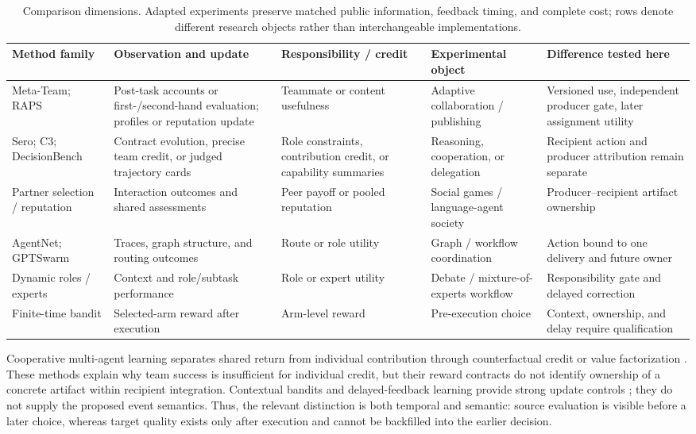 \documentclass[sigconf,anonymous]{aamas}
\begin{document}
\begin{table}[t]
\centering\scriptsize
\setlength{\tabcolsep}{2.7pt}
\begin{tabular}{p{}p{}p{}p{}p{}}
\toprule
Method family & Observation and update & Responsibility / credit & Experimental object & Difference tested here \\
\midrule
Meta-Team; RAPS \cite{hao2026metateam,li2026raps} & Post-task accounts or first-/second-hand evaluation; profiles or reputation update & Teammate or content usefulness & Adaptive collaboration / publishing & Versioned use, independent producer gate, later assignment utility \\
Sero; C3; DecisionBench \cite{ge2026sero,chen2026c3,gao2026decisionbench} & Contract evolution, precise team credit, or judged trajectory cards & Role constraints, contribution credit, or capability summaries & Reasoning, cooperation, or delegation & Recipient action and producer attribution remain separate \\
Partner selection / reputation \cite{leung2025partner,russell2026partner,ren2026reputation} & Interaction outcomes and shared assessments & Peer payoff or pooled reputation & Social games / language-agent society & Producer--recipient artifact ownership \\
AgentNet; GPTSwarm \cite{yang2025agentnet,zhuge2024gptswarm} & Traces, graph structure, and routing outcomes & Route or role utility & Graph / workflow coordination & Action bound to one delivery and future owner \\
Dynamic roles / experts \cite{zhang2026dynamic,li2026morse} & Context and role/subtask performance & Role or expert utility & Debate / mixture-of-experts workflow & Responsibility gate and delayed correction \\
Finite-time bandit \cite{auer2002finite} & Selected-arm reward after execution & Arm-level reward & Pre-execution choice & Context, ownership, and delay require qualification \\
\bottomrule
\end{tabular}
\caption{Comparison dimensions. Adapted experiments preserve matched public information, feedback timing, and complete cost; rows denote different research objects rather than interchangeable implementations.}
\label{tab:positioning}
\end{table}

Cooperative multi-agent learning separates shared return from individual contribution through counterfactual credit or value factorization \cite{foerster2018coma,rashid2020qmix}. These methods explain why team success is insufficient for individual credit, but their reward contracts do not identify ownership of a concrete artifact within recipient integration. Contextual bandits and delayed-feedback learning provide strong update controls \cite{li2010contextual,joulani2013delayed}; they do not supply the proposed event semantics. Thus, the relevant distinction is both temporal and semantic: source evaluation is visible before a later choice, whereas target quality exists only after execution and cannot be backfilled into the earlier decision.
\end{document}
